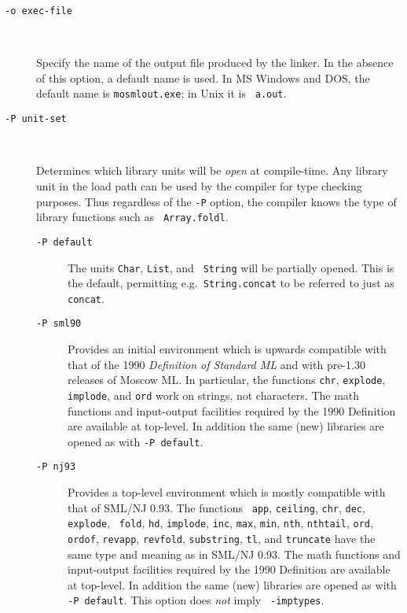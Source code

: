 \documentclass[fleqn]{article}
\begin{document}
\begin{description}
\item[{\tt -o {\rm exec-file}}]\mbox{ }

  Specify the name of the output file produced by the linker.  In the
  absence of this option, a default name is used.  In MS Windows and
  DOS, the default name is {\tt mosmlout.exe}; in Unix it is {\tt
    a.out}.

\item[{\tt -P {\rm unit-set}}]\mbox{ }

  Determines which library units will be {\em open\/} at compile-time.
  Any library unit in the load path can be used by the compiler for
  type checking purposes.  Thus regardless of the {\tt -P} option, the
  compiler knows the type of library functions such as {\tt
    Array.foldl}.

  \begin{description}
  \item[{\tt -P default}] The units {\tt Char}, {\tt List}, and {\tt
      String} will be partially opened.  This is the default,
    permitting e.g.\ {\tt String.concat} to be referred to just as
    {\tt concat}.

  \item[{\tt -P sml90}] Provides an initial environment which is
    upwards compatible with that of the 1990 {\em Definition of
      Standard ML\/} and with pre-1.30 releases of Moscow ML\@.  In
    particular, the functions {\tt chr}, {\tt explode}, {\tt implode},
    and {\tt ord} work on strings, not characters.  The math functions
    and input-output facilities required by the 1990 Definition
    \cite[Appendix C and D]{Milner:1990:TheDefinition} are available
    at top-level.  In addition the same (new) libraries are opened as
    with {\tt -P default}.

  \item[{\tt -P nj93}] Provides a top-level environment which is
    mostly compatible with that of SML/NJ 0.93.  The functions {\tt
      app}, {\tt ceiling}, {\tt chr}, {\tt dec}, {\tt explode}, {\tt
      fold}, {\tt hd}, {\tt implode}, {\tt inc}, {\tt max}, {\tt min},
    {\tt nth}, {\tt nthtail}, {\tt ord}, {\tt ordof}, {\tt revapp},
    {\tt revfold}, {\tt substring}, {\tt tl}, and {\tt truncate} have
    the same type and meaning as in SML/NJ 0.93.  The math functions
    and input-output facilities required by the 1990 Definition
    \cite[Appendix C and D]{Milner:1990:TheDefinition} are available
    at top-level.  In addition the same (new) libraries are opened as
    with {\tt -P default}.  This option does {\em not\/} imply {\tt
      -imptypes}.


\end{description}
\end{description}
\end{document}
